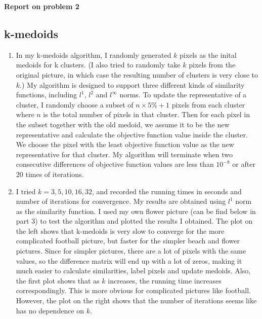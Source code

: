 \documentclass[twoside,10pt]{article}
\begin{document}
\begin{tcolorbox} 
        \begin{center}
    \textbf{Report on problem 2}
\end{center}

\subsection{k-medoids}
\begin{enumerate}
    \item In my k-medoids algorithm, I randomly generated $k$ pixels as the inital medoids for k clusters. (I also tried to randomly take $k$ pixels from the original picture, in which case the resulting number of clusters is very close to $k$.) My algorithm is designed to support three different kinds of similarity functions, including $l^1$, $l^2$ and $l^{\infty}$ norms. To update the representative of a cluster, I randomly choose a subset of $n\times 5\% + 1$ pixels from each cluster where $n$ is the total number of pixels in that cluster. Then for each pixel in the subset together with the old medoid, we assume it to be the new representative and calculate the objective function value inside the cluster. We choose the pixel with the least objective function value as the new representative for that cluster. My algorithm will terminate when two consecutive differences of objective function values are less than $10^{-8}$ or after 20 times of iterations. 
    
    \item I tried $k = 3,5,10,16,32$, and recorded the running times in seconds and number of iterations for convergence. My results are obtained using $l^1$ norm as the similarity function. I used my own flower picture (can be find below in part 3) to test the algorithm and plotted the results I obtained. The plot on the left shows that k-medoids is very slow to converge for the more complicated football picture, but faster for the simpler beach and flower pictures. Since for simpler pictures, there are a lot of pixels with the same values, so the difference matrix will end up with a lot of zeros, making it much easier to calculate similarities, label pixels and update medoids. Also, the first plot shows that as $k$ increases, the running time increases correspondingly. This is more obvious for complicated pictures like football. However, the plot on the right shows that the number of iterations seems like has no dependence on $k$. 
    

\end{enumerate}
\end{tcolorbox}
\end{document}
